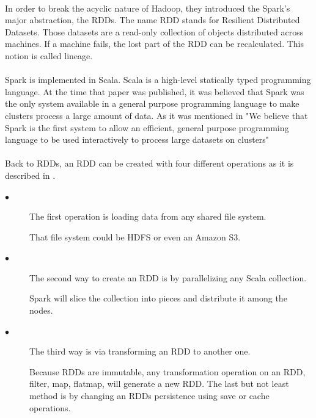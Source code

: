 \paragraph{}In order to break the acyclic nature of Hadoop, they introduced the Spark's major abstraction, the RDDs. The name RDD stands for Resilient Distributed Datasets. Those datasets are a read-only collection of objects distributed across machines. If a machine fails, the lost part of the RDD can be recalculated. This notion is called lineage.

\paragraph{}Spark is implemented in Scala. Scala is a high-level statically typed programming language. At the time that paper was published, it was believed that Spark was the only system available in a general purpose programming language to make clusters process a large amount of data. As it was mentioned in \cite{Zaharia:2010:SCC:1863103.1863113} "We believe that Spark is the first system to allow an efficient, general purpose programming language to be used interactively to process large datasets on clusters"

\paragraph{}Back to RDDs, an RDD can be created with four different operations as it is described in \cite{Zaharia:2010:SCC:1863103.1863113}.

\begin{description}
	\item[$\bullet$] The first operation is loading data from any shared file system. 
	
	That file system could be HDFS or even an Amazon S3. 
	\item[$\bullet$] The second way to create an RDD is by parallelizing any Scala collection. 
	
	Spark will slice the collection into pieces and distribute it among the nodes.
	\item[$\bullet$] The third way is via transforming an RDD to another one. 
	
	Because RDDs are immutable, any transformation operation on an RDD, filter, map, flatmap, will generate a new RDD. The last but not least method is by changing an RDDs persistence using save or cache operations.
\end{description}


